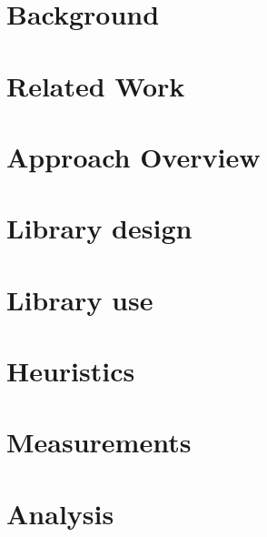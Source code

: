
%
\chapter{Background}
\chapter{Related Work}
%
\chapter{Approach Overview}
\chapter{Library design}
\chapter{Library use}
%
\chapter{Heuristics}
\chapter{Measurements}
\chapter{Analysis}
%

